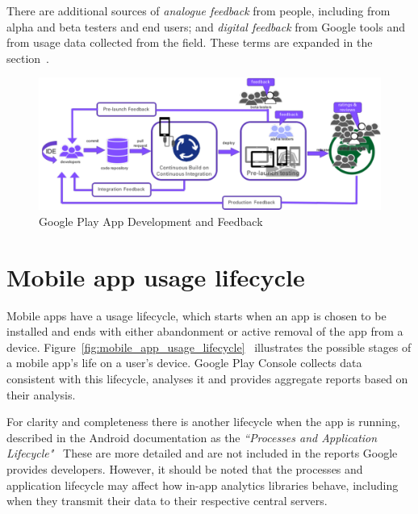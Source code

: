 There are additional sources of \emph{analogue feedback} from people, including from alpha and beta testers and end users; and \emph{digital feedback} from Google tools and from usage data collected from the field. These terms are expanded in the section~\href{analogue-and-digital-feedback}{\emph{}}.

\begin{figure}
    \includegraphics[width=\linewidth]{images/google-play-app-development.pdf}
    \caption{Google Play App Development and Feedback}
    \label{fig:google-play-app-development-and-feedback}
\end{figure}


\section{Mobile app usage lifecycle}
Mobile apps have a usage lifecycle, which starts when an app is chosen to be installed and ends with either abandonment or active removal of the app from a device. Figure~\ref{fig:mobile_app_usage_lifecycle}~ illustrates the possible stages of a mobile app's life on a user's device. Google Play Console collects data consistent with this lifecycle, analyses it and provides aggregate reports based on their analysis. 

For clarity and completeness there is another lifecycle when the app is running, described in the Android documentation as the \emph{``Processes and Application Lifecycle"}~ These are more detailed and are not included in the reports Google provides developers. %
However, it should be noted that the processes and application lifecycle may affect how in-app analytics libraries behave, including when they transmit their data to their respective central servers.

